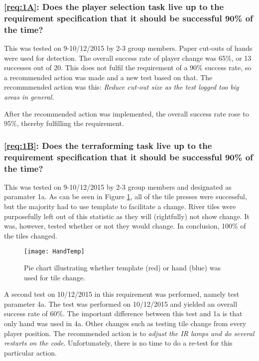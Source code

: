 	\subsubsection*{\ref{req:1A}: Does the player selection task live up to the requirement specification that it should be successful 90\% of the time?}
This was tested on 9-10/12/2015 by 2-3 group members. Paper cut-outs of hands were used for detection. The overall success rate of player change was 65\%, or 13 successes out of 20. This does not fulfil the requirement of a 90\% success rate, so a recommended action was made and a new test based on that.
The recommmended action was this: \textit{Reduce cut-out size as the test logged too big areas in general.}

After the recommended action was implemented, the overall success rate rose to 95\%, thereby fulfilling the requirement.

	\subsubsection*{\ref{req:1B}: Does the terraforming task live up to the requirement specification that it should be successful 90\% of the time?}
	This was tested on 9-10/12/2015 by 2-3 group members and designated as paramater 1a. As can be seen in Figure \ref{fig:techHandTemp}, all of the tile presses were successful, but the majority had to use template to facilitate a change. River tiles were purposefully left out of this statistic as they will (rightfully) not show change. It was, however, tested whether or not they would change. In conclusion, 100\% of the tiles changed.
	
\begin{figure}[h!]
	\centering
	\texttt{[image: HandTemp]}
	\caption{Pie chart illustrating whether template (red) or hand (blue) was used for tile change.} 
	\label{fig:techHandTemp}
\end{figure}
	
	A second test on 10/12/2015 in this requirement was performed, namely test parameter 4a. The test was performed on 10/12/2015 and yielded an overall success rate of 60\%. The important difference between this test and 1a is that only hand was used in 4a. Other changes such as testing tile change from every player position. The recommended action is to \textit{adjust the IR lamps and do several restarts on the code}. Unfortunately, there is no time to do a re-test for this particular action.
	
